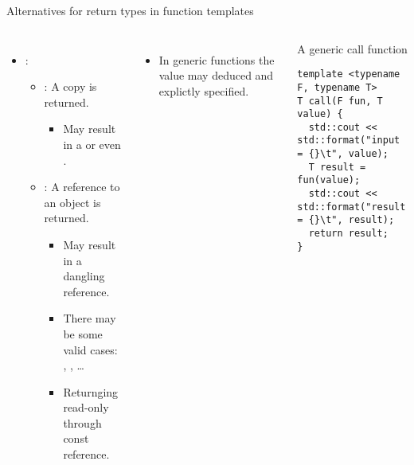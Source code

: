 \begin{frame}[t,fragile]{Alternatives for return types in function templates}

\begin{columns}[T]

\begin{itemize}
  \item {}: 
    \begin{itemize}
      \item {}: A copy is returned.
        \begin{itemize}
          \item May result in a  or even .
        \end{itemize}
      \item {}: A reference to an object is returned.
        \begin{itemize}
          \item May result in a dangling reference.
          \item There may be some valid cases: , , \ldots
          \item Returnging read-only through const reference.
        \end{itemize}
    \end{itemize}
\end{itemize}

\pause
{}
\begin{itemize}
  \item In generic functions the value may deduced and explictly specified.
\end{itemize}
\begin{block}{A generic call function}
\begin{lstlisting}
template <typename F, typename T>
T call(F fun, T value) {
  std::cout << std::format("input = {}\t", value);
  T result = fun(value);
  std::cout << std::format("result = {}\t", result);
  return result;
}
\end{lstlisting}
\end{block}

\end{columns}
 
\end{frame}


